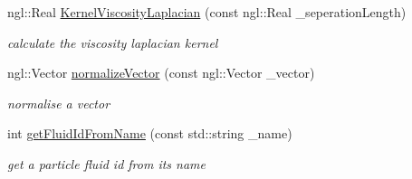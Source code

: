 \begin{DoxyCompactItemize}
ngl::Real \hyperlink{class_s_p_h_solver_a3e4f7c09c45d3f49fa38f813d55e724b}{KernelViscosityLaplacian} (const ngl::Real \_\-seperationLength)
\begin{DoxyCompactList}\small\item\em calculate the viscosity laplacian kernel \item\end{DoxyCompactList}\item 
ngl::Vector \hyperlink{class_s_p_h_solver_a22ef88cb68a8f4befa6f281e10cf65a6}{normalizeVector} (const ngl::Vector \_\-vector)
\begin{DoxyCompactList}\small\item\em normalise a vector \item\end{DoxyCompactList}\item 
int \hyperlink{class_s_p_h_solver_acfa822e4291299eb6e6875347515572c}{getFluidIdFromName} (const std::string \_\-name)
\begin{DoxyCompactList}\small\item\em get a particle fluid id from its name \item\end{DoxyCompactList}\end{DoxyCompactItemize}
